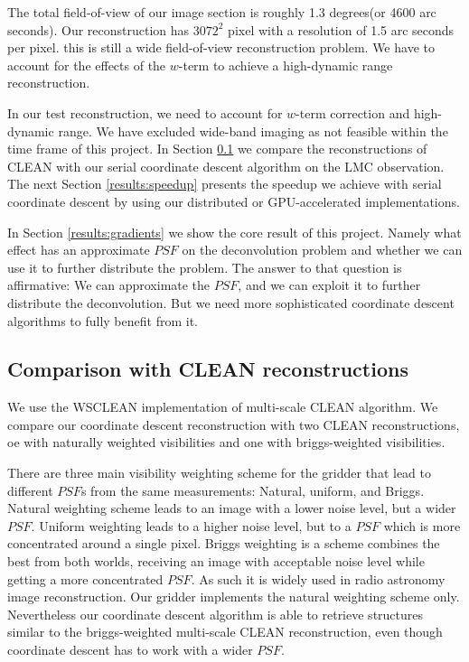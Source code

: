 The total field-of-view of our image section is roughly 1.3 degrees(or 4600 arc seconds). Our reconstruction has $3072^2$ pixel with a resolution of 1.5 arc seconds per pixel. this is still a wide field-of-view reconstruction problem. We have to account for the effects of the $w$-term to achieve a high-dynamic range reconstruction.

In our test reconstruction, we need to account for $w$-term correction and high-dynamic range. We have excluded wide-band imaging as not feasible within the time frame of this project. In Section \ref{results:cleancomp} we compare the reconstructions of CLEAN with our serial coordinate descent algorithm on the LMC observation. The next Section \ref{results:speedup} presents the speedup we achieve with serial coordinate descent by using our distributed or GPU-accelerated implementations.

In Section \ref{results:gradients} we show the core result of this project. Namely what effect has an approximate $PSF$ on the deconvolution problem and whether we can use it to further distribute the problem. The answer to that question is affirmative: We can approximate the $PSF$, and we can exploit it to further distribute the deconvolution. But we need more sophisticated coordinate descent algorithms to fully benefit from it.


\subsection{Comparison with CLEAN reconstructions} \label{results:cleancomp}
We use the WSCLEAN \cite{offringa2014wsclean} implementation of multi-scale CLEAN algorithm. We compare our coordinate descent reconstruction with two CLEAN reconstructions, oe with naturally weighted visibilities and one with briggs-weighted visibilities.

There are three main visibility weighting scheme for the gridder that lead to different $PSF$s from the same measurements: Natural, uniform, and Briggs\cite{briggsWeighting}. Natural weighting scheme leads to an image with a lower noise level, but a wider $PSF$. Uniform weighting leads to a higher noise level, but to a $PSF$ which is more concentrated around a single pixel. Briggs weighting is a scheme combines the best from both worlds, receiving an image with acceptable noise level while getting a more concentrated $PSF$. As such it is widely used in radio astronomy image reconstruction. Our gridder implements the natural weighting scheme only. Nevertheless our coordinate descent algorithm is able to retrieve structures similar to the briggs-weighted multi-scale CLEAN reconstruction, even though coordinate descent has to work with a wider $PSF$.

